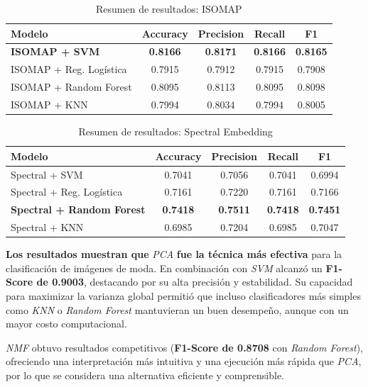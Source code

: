 \documentclass[conference]{IEEEtran}
\begin{document}
\begin{table}[H]
\centering
\caption{Resumen de resultados: ISOMAP}
\begin{tabular}{lcccc}
\toprule
\textbf{Modelo} & \textbf{Accuracy} & \textbf{Precision} & \textbf{Recall} & \textbf{F1} \\
\midrule
\textbf{ISOMAP + SVM} & \textbf{0.8166} & \textbf{0.8171} & \textbf{0.8166} & \textbf{0.8165} \\
ISOMAP + Reg. Logística & 0.7915 & 0.7912 & 0.7915 & 0.7908 \\
ISOMAP + Random Forest & 0.8095 & 0.8113 & 0.8095 & 0.8098 \\
ISOMAP + KNN & 0.7994 & 0.8034 & 0.7994 & 0.8005 \\
\bottomrule
\end{tabular}
\label{tab:isomap}
\end{table}
\vspace{-6pt}

\begin{table}[H]
\centering
\caption{Resumen de resultados: Spectral Embedding}
\begin{tabular}{lcccc}
\toprule
\textbf{Modelo} & \textbf{Accuracy} & \textbf{Precision} & \textbf{Recall} & \textbf{F1} \\
\midrule
Spectral + SVM & 0.7041 & 0.7056 & 0.7041 & 0.6994 \\
Spectral + Reg. Logística & 0.7161 & 0.7220 & 0.7161 & 0.7166 \\
\textbf{Spectral + Random Forest} & \textbf{0.7418} & \textbf{0.7511} & \textbf{0.7418} & \textbf{0.7451} \\
Spectral + KNN & 0.6985 & 0.7204 & 0.6985 & 0.7047 \\
\bottomrule
\end{tabular}
\label{tab:spectral}
\end{table}
\vspace{-6pt}

	\textbf{Los resultados muestran que} \textit{PCA} \textbf{fue la técnica más efectiva} para la clasificación de imágenes de moda. En combinación con \textit{SVM} alcanzó un \textbf{F1-Score de 0.9003}, destacando por su alta precisión y estabilidad. Su capacidad para maximizar la varianza global permitió que incluso clasificadores más simples como \textit{KNN} o \textit{Random Forest} mantuvieran un buen desempeño, aunque con un mayor costo computacional.

\vspace{2pt}
	\textit{NMF} obtuvo resultados competitivos (\textbf{F1-Score de 0.8708} con \textit{Random Forest}), ofreciendo una interpretación más intuitiva y una ejecución más rápida que \textit{PCA}, por lo que se considera una alternativa eficiente y comprensible.
\end{document}
